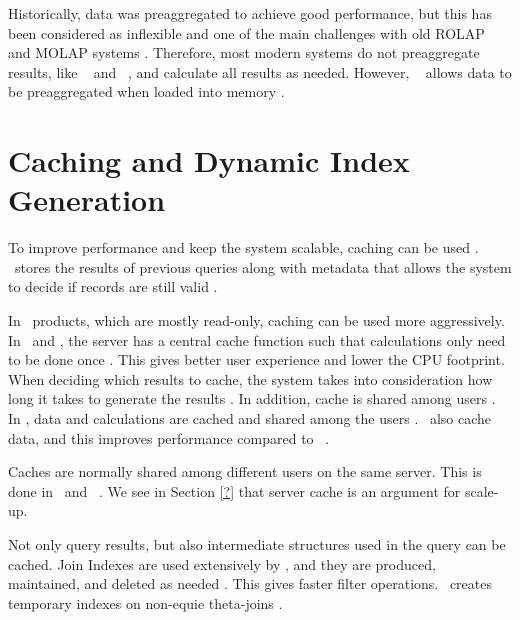 Historically, data was preaggregated to achieve good performance, but this has been considered as inflexible and one of the main challenges with old ROLAP and MOLAP systems \cite{Boncz2002-yj}. Therefore, most modern systems do not preaggregate results, like \sapnw~\cite{Lemke2010-is} and \qlikview~\cite{Qlik2014-vd}, and calculate all results as needed. However, \qlikview~ allows data to be preaggregated when loaded into memory \cite{Qlik2011-yc}.



\section{Caching and Dynamic Index Generation}
\label{sec:Caching}
To improve performance and keep the system scalable, caching can be used \cite{Plattner2014-fr}. \exasol~stores the results of previous queries along with metadata that allows the system to decide if records are still valid \cite{Exasol2014-xh}. 

In \bd~products, which are mostly read-only, caching can be used more aggressively. In \qlikview~and \tableau, the server has a central cache function such that calculations only need to be done once \cite{Kamkolkar2015-iq, Qlik2011-ef}. This gives better user experience and lower the CPU footprint. When deciding which results to cache, the system takes into consideration how long it takes to generate the results \cite{noauthor_undateds-js}. In addition, cache is shared among users \cite{Qlik2011-yc}. In \tableau, data and calculations are cached and shared among the users \cite{Kamkolkar2015-iq}. \vertipaq~also cache data, and this improves performance compared to \mssql~\cite{Ferrari2012-hm}.

Caches are normally shared among different users on the same server. This is done in \qlikview~and \tableau~\cite{Kamkolkar2015-iq Qlik2011-yc}. We see in Section \ref{?} that server cache is an argument for scale-up.

Not only query results, but also intermediate structures used in the query can be cached. Join Indexes are used extensively by \exasol, and they are produced, maintained, and deleted as needed \cite{Exasol2014-xh}. This gives faster filter operations. \monetxq~creates temporary indexes on non-equie theta-joins \cite{Boncz2006-md}.

